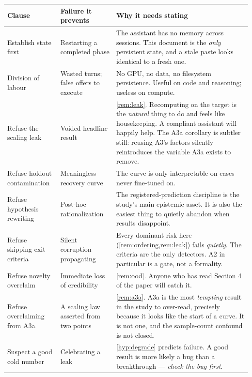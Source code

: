\documentclass[10pt,a4paper]{article}
\theoremstyle{definition}
\begin{document}
\begin{center}\small
\begin{tabular}{@{}p{3.6cm}p{5.2cm}p{6.4cm}@{}}
\toprule
\textbf{Clause} & \textbf{Failure it prevents} & \textbf{Why it needs stating}
\\
\midrule
Establish state first
  & Restarting a completed phase
  & The assistant has no memory across sessions. This document is the
    \emph{only} persistent state, and a stale paste looks identical to a fresh one. \\[0.3em]
Division of labour
  & Wasted turns; false offers to execute
  & No GPU, no data, no filesystem persistence. Useful on code and reasoning;
    useless on compute. \\[0.3em]
Refuse the scaling leak
  & Voided headline result
  & \cref{rem:leak}. Recomputing on the target is the \emph{natural} thing to do and
    feels like housekeeping. A compliant assistant will happily help. The A3a corollary
    is subtler still: reusing A3's factors silently reintroduces the variable A3a
    exists to remove. \\[0.3em]
Refuse holdout contamination
  & Meaningless recovery curve
  & The curve is only interpretable on cases never fine-tuned on. \\[0.3em]
Refuse hypothesis rewriting
  & Post-hoc rationalization
  & The registered-prediction discipline is the study's main epistemic asset. It is
    also the easiest thing to quietly abandon when results disappoint. \\[0.3em]
Refuse skipping exit criteria
  & Silent corruption propagating
  & Every dominant risk here (\cref{rem:ordering,rem:leak}) fails \emph{quietly}. The
    criteria are the only detectors. A2 in particular is a gate, not a formality. \\[0.3em]
Refuse novelty overclaim
  & Immediate loss of credibility
  & \cref{rem:ood}. Anyone who has read Section 4 of the paper will catch it. \\[0.3em]
Refuse overclaiming from A3a
  & A scaling law asserted from two points
  & \cref{rem:a3a}. A3a is the most \emph{tempting} result in the study to over-read,
    precisely because it looks like the start of a curve. It is not one, and the
    sample-count confound is not closed. \\[0.3em]
Suspect a good cold number
  & Celebrating a leak
  & \cref{hyp:degrade} predicts failure. A good result is more likely a bug than a
    breakthrough --- \emph{check the bug first}. \\
\bottomrule
\end{tabular}
\end{center}
\end{document}

